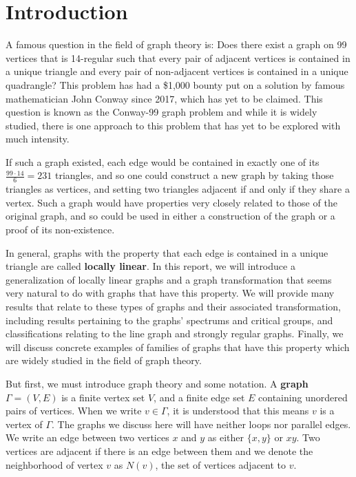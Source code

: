 \documentclass[12pt]{report}
\theoremstyle{definition}
\begin{document}
\chapter{Introduction}
A famous question in the field of graph theory is: Does there exist a graph on 99 vertices that is 14-regular such that every pair of adjacent vertices is contained in a unique triangle and every pair of non-adjacent vertices is contained in a unique quadrangle? This problem has had a \$1,000 bounty put on a solution by famous mathematician John Conway since 2017, which has yet to be claimed. This question is known as the Conway-99 graph problem and while it is widely studied, there is one approach to this problem that has yet to be explored with much intensity.\par
If such a graph existed, each edge would be contained in exactly one of its $\frac{99\cdot14}{6}=231$ triangles, and so one could construct a new graph by taking those triangles as vertices, and setting two triangles adjacent if and only if they share a vertex. Such a graph would have properties very closely related to those of the original graph, and so could be used in either a construction of the graph or a proof of its non-existence.\par
In general, graphs with the property that each edge is contained in a unique triangle are called \textbf{locally linear}. In this report, we will introduce a generalization of locally linear graphs and a graph transformation that seems very natural to do with graphs that have this property. We will provide many results that relate to these types of graphs and their associated transformation, including results pertaining to the graphs' spectrums and critical groups, and classifications relating to the line graph and strongly regular graphs. Finally, we will discuss concrete examples of families of graphs that have this property which are widely studied in the field of graph theory.\par
But first, we must introduce graph theory and some notation. A \textbf{graph} $\Gamma=(V,E)$ is a finite vertex set $V$, and a finite edge set $E$ containing unordered pairs of vertices. When we write $v\in \Gamma$, it is understood that this means $v$ is a vertex of $\Gamma$. The graphs we discuss here will have neither loops nor parallel edges. We write an edge between two vertices $x$ and $y$ as either $\{x,y\}$ or $xy$. Two vertices are adjacent if there is an edge between them and we denote the neighborhood of vertex $v$ as $N(v)$, the set of vertices adjacent to $v$.\par
\end{document}

